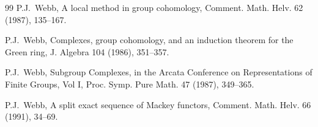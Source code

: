 \documentclass[12pt]{amsart}
\theoremstyle{plain}
\theoremstyle{definition}
\theoremstyle{remark}
\numberwithin{equation}{section}
\begin{document}
\begin{thebibliography}{99}
P.J.~Webb, A local method in group cohomology, Comment. Math. Helv. 62 (1987), 135--167.

P.J.~Webb, Complexes, group cohomology, and an induction theorem for the Green ring, J. Algebra 104 (1986), 351--357.

P.J.~Webb, Subgroup Complexes, in the Arcata Conference on Representations of Finite Groups, Vol I, Proc. Symp. Pure Math. 47 (1987), 349--365.

P.J.~Webb, A split exact sequence of Mackey functors, Comment. Math. Helv. 66 (1991), 34--69.




\end{thebibliography}
\end{document}
